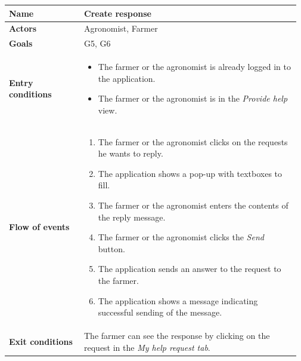 \begin{table}[H]
    \centering
	\begin{tabular}{@{}p{0.25\linewidth} p{0.72\linewidth}@{}}
\toprule
		\textbf{Name}               & Create response\\
		\midrule
		\textbf{Actors}             & Agronomist, Farmer\\
		\midrule
		\textbf{Goals}              & G5, G6 \\
		\midrule
		
		\textbf{Entry conditions}   & \begin{itemize}[leftmargin=.4cm,noitemsep,topsep=0pt,before=\vspace{-3mm},after=\vspace{-4mm}]
		    \item The farmer or the agronomist is already logged in to the application.
		    \item The farmer or the agronomist is in the \textit{Provide help} view.
		\end{itemize}\\
		\midrule
		
		\textbf{Flow of events}     & \begin{enumerate}[leftmargin=.4cm,noitemsep,topsep=0pt,before=\vspace{-3mm},after=\vspace{-4mm}]
		    \item The farmer or the agronomist clicks on the requests he wants to reply. 
		    \item The application shows a pop-up with textboxes to fill.
		    \item The farmer or the agronomist enters the contents of the reply message.
		    \item The farmer or the agronomist clicks the \textit{Send} button.
		    \item The application sends an answer to the request to the farmer.
		    \item The application shows a message indicating successful sending of the message.
		\end{enumerate}\\
		\midrule
		\textbf{Exit conditions}    & The farmer can see the response by clicking on the request in the \textit{My help request tab}. \\
		\midrule
		

\end{tabular}
\end{table}
